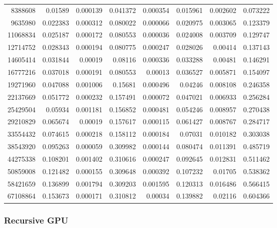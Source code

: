 \begin{tabular}{r r r r r r r r}
8388608 & 0.01589 & 0.000139 & 0.041372 & 0.000354 & 0.015961 & 0.002602 & 0.073222 \\
9635980 & 0.022383 & 0.000312 & 0.080022 & 0.000066 & 0.020975 & 0.003065 & 0.123379 \\
11068834 & 0.025187 & 0.000172 & 0.080553 & 0.000036 & 0.024008 & 0.003709 & 0.129747 \\
12714752 & 0.028343 & 0.000194 & 0.080775 & 0.000247 & 0.028026 & 0.00414 & 0.137143 \\
14605414 & 0.031844 & 0.00019 & 0.08116 & 0.000336 & 0.033288 & 0.00481 & 0.146291 \\
16777216 & 0.037018 & 0.000191 & 0.080553 & 0.00013 & 0.036527 & 0.005871 & 0.154097 \\
19271960 & 0.047088 & 0.001006 & 0.15681 & 0.000496 & 0.04246 & 0.008108 & 0.246358 \\
22137669 & 0.051772 & 0.000232 & 0.157491 & 0.000072 & 0.047021 & 0.006933 & 0.256284 \\
25429504 & 0.05934 & 0.001181 & 0.156852 & 0.000481 & 0.054246 & 0.008957 & 0.270438 \\
29210829 & 0.065674 & 0.00019 & 0.157617 & 0.000115 & 0.061427 & 0.008767 & 0.284717 \\
33554432 & 0.074615 & 0.000218 & 0.158112 & 0.000184 & 0.07031 & 0.010182 & 0.303038 \\
38543920 & 0.095263 & 0.000059 & 0.309982 & 0.000144 & 0.080474 & 0.011391 & 0.485719 \\
44275338 & 0.108201 & 0.001402 & 0.310616 & 0.000247 & 0.092645 & 0.012831 & 0.511462 \\
50859008 & 0.121482 & 0.000155 & 0.309648 & 0.000392 & 0.107232 & 0.01705 & 0.538362 \\
58421659 & 0.136899 & 0.001794 & 0.309203 & 0.001595 & 0.120313 & 0.016486 & 0.566415 \\
67108864 & 0.153673 & 0.000171 & 0.310812 & 0.00034 & 0.139882 & 0.02116 & 0.604366 \\
\end{tabular}

\subsubsection{Recursive GPU}

